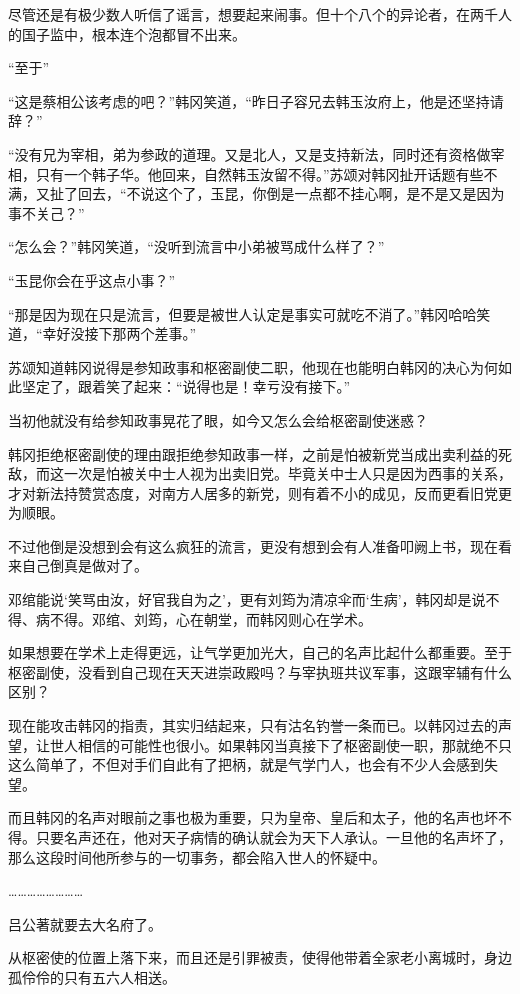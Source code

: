 尽管还是有极少数人听信了谣言，想要起来闹事。但十个八个的异论者，在两千人的国子监中，根本连个泡都冒不出来。

“至于”

“这是蔡相公该考虑的吧？”韩冈笑道，“昨日子容兄去韩玉汝府上，他是还坚持请辞？”

“没有兄为宰相，弟为参政的道理。又是北人，又是支持新法，同时还有资格做宰相，只有一个韩子华。他回来，自然韩玉汝留不得。”苏颂对韩冈扯开话题有些不满，又扯了回去，“不说这个了，玉昆，你倒是一点都不挂心啊，是不是又是因为事不关己？”

“怎么会？”韩冈笑道，“没听到流言中小弟被骂成什么样了？”

“玉昆你会在乎这点小事？”

“那是因为现在只是流言，但要是被世人认定是事实可就吃不消了。”韩冈哈哈笑道，“幸好没接下那两个差事。”

苏颂知道韩冈说得是参知政事和枢密副使二职，他现在也能明白韩冈的决心为何如此坚定了，跟着笑了起来：“说得也是！幸亏没有接下。”

当初他就没有给参知政事晃花了眼，如今又怎么会给枢密副使迷惑？

韩冈拒绝枢密副使的理由跟拒绝参知政事一样，之前是怕被新党当成出卖利益的死敌，而这一次是怕被关中士人视为出卖旧党。毕竟关中士人只是因为西事的关系，才对新法持赞赏态度，对南方人居多的新党，则有着不小的成见，反而更看旧党更为顺眼。

不过他倒是没想到会有这么疯狂的流言，更没有想到会有人准备叩阙上书，现在看来自己倒真是做对了。

邓绾能说‘笑骂由汝，好官我自为之’，更有刘筠为清凉伞而‘生病’，韩冈却是说不得、病不得。邓绾、刘筠，心在朝堂，而韩冈则心在学术。

如果想要在学术上走得更远，让气学更加光大，自己的名声比起什么都重要。至于枢密副使，没看到自己现在天天进崇政殿吗？与宰执班共议军事，这跟宰辅有什么区别？

现在能攻击韩冈的指责，其实归结起来，只有沽名钓誉一条而已。以韩冈过去的声望，让世人相信的可能性也很小。如果韩冈当真接下了枢密副使一职，那就绝不只这么简单了，不但对手们自此有了把柄，就是气学门人，也会有不少人会感到失望。

而且韩冈的名声对眼前之事也极为重要，只为皇帝、皇后和太子，他的名声也坏不得。只要名声还在，他对天子病情的确认就会为天下人承认。一旦他的名声坏了，那么这段时间他所参与的一切事务，都会陷入世人的怀疑中。

……………………

吕公著就要去大名府了。

从枢密使的位置上落下来，而且还是引罪被责，使得他带着全家老小离城时，身边孤伶伶的只有五六人相送。

